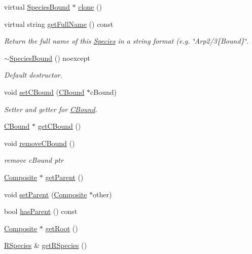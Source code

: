 \begin{DoxyCompactItemize}
virtual \hyperlink{classSpeciesBound}{Species\+Bound} $\ast$ \hyperlink{classSpeciesBound_a729e4ef2724698f48c45e17972fa1726}{clone} ()
\item 
virtual string \hyperlink{classSpeciesBound_a251dcc12a2599a4df36155539cb0efeb}{get\+Full\+Name} () const 
\begin{DoxyCompactList}\small\item\em Return the full name of this \hyperlink{classSpecies}{Species} in a string format (e.\+g. \char`\"{}\+Arp2/3\{\+Bound\}\char`\"{}. \end{DoxyCompactList}\item 
\hyperlink{classSpeciesBound_a7ac5d93e32405d9ae4f84efdf943e83c}{$\sim$\+Species\+Bound} () noexcept
\begin{DoxyCompactList}\small\item\em Default destructor. \end{DoxyCompactList}\item 
void \hyperlink{classSpeciesBound_a33c3de1c4a1e2f63f390b2bfd53fcfa1}{set\+C\+Bound} (\hyperlink{classCBound}{C\+Bound} $\ast$c\+Bound)
\begin{DoxyCompactList}\small\item\em Setter and getter for \hyperlink{classCBound}{C\+Bound}. \end{DoxyCompactList}\item 
\hyperlink{classCBound}{C\+Bound} $\ast$ \hyperlink{classSpeciesBound_ad55d11c86de01f2381ac9d5a286d8cea}{get\+C\+Bound} ()
\item 
void \hyperlink{classSpeciesBound_a904307cc8343605a9dbb05d4f2fa6bf9}{remove\+C\+Bound} ()
\begin{DoxyCompactList}\small\item\em remove c\+Bound ptr \end{DoxyCompactList}\item 
\hyperlink{classComposite}{Composite} $\ast$ \hyperlink{classSpecies_af24cab7cbaa561d35b08fef5faf05fdf}{get\+Parent} ()
\item 
void \hyperlink{classSpecies_acc64c5b61abf911872d433ac32b62de8}{set\+Parent} (\hyperlink{classComposite}{Composite} $\ast$other)
\item 
bool \hyperlink{classSpecies_a40262d7217fcc28a31682aee40a19232}{has\+Parent} () const 
\item 
\hyperlink{classComposite}{Composite} $\ast$ \hyperlink{classSpecies_a876c8a827476a11e05f3b7a7669c29b6}{get\+Root} ()
\item 
\hyperlink{classRSpecies}{R\+Species} \& \hyperlink{classSpecies_a048dd7bc3fecd08b1b1797dc83aa163d}{get\+R\+Species} ()

\end{DoxyCompactItemize}
